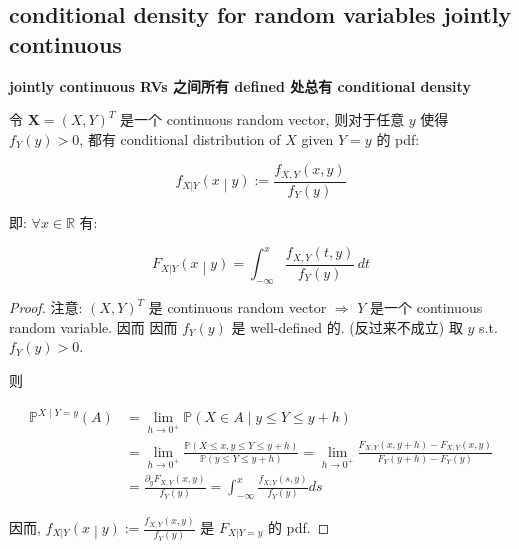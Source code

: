 \documentclass{qlnotes-export}
\begin{document}
\subsection{conditional density for random variables jointly continuous}\label{conditional-density-for-random-variables-jointly-continuous}

\begin{theorem}{\protect{}\label{kn-jointly-continuous-rvs-defined-conditional-density}{\textbf{jointly
continuous RVs 之间所有 defined 处总有 conditional density}}}\label{thm-03-joint-conditional-distribution-jointly-continuous-rvs-defined-conditional-density}

令 \(\mathbf{X} = (X,Y)^{T}\) 是一个 continuous random vector, 则对于任意 \(y\) 使得 \(f_{Y}(y) > 0\), 都有 conditional distribution of \(X\) given \(Y = y\) 的 pdf:

\[\left. f_{X|Y}(x \middle| y) := \frac{f_{X,Y}(x,y)}{f_{Y}(y)} \right.\]

即: \(\forall x \in {\mathbb{R}}\) 有:

\[\left. F_{X|Y}(x \middle| y) = \int_{- \infty}^{x}\frac{f_{X,Y}(t,y)}{f_{Y}(y)}\, dt \right.\]

\end{theorem}

\begin{proof}

注意: \((X,Y)^{T}\) 是 continuous random vector \(\Longrightarrow\) \(Y\) 是一个 continuous random variable. 因而 因而 \(f_{Y}(y)\) 是 well-defined 的. (反过来不成立) 取 \(y\) s.t. \(f_{Y}(y) > 0\).

则

\[\begin{matrix}
{{\mathbb{P}}^{X \mid Y = y}(A)} & {= \lim\limits_{h\rightarrow 0^{+}}{\mathbb{P}}(X \in A \mid y \leq Y \leq y + h)} \\
 & {= \lim\limits_{h\rightarrow 0^{+}}\frac{{\mathbb{P}}(X \leq x,y \leq Y \leq y + h)}{{\mathbb{P}}(y \leq Y \leq y + h)} = \lim\limits_{h\rightarrow 0^{+}}\frac{F_{X,Y}(x,y + h) - F_{X,Y}(x,y)}{F_{Y}(y + h) - F_{Y}(y)}} \\
 & {= \frac{\partial_{y}F_{X,Y}(x,y)}{f_{Y}(y)} = \int_{- \infty}^{x}\frac{f_{X,Y}(s,y)}{f_{Y}(y)}ds}
\end{matrix}\]

因而, \(\left. f_{X|Y}(x \middle| y) := \frac{f_{X,Y}(x,y)}{f_{Y}(y)} \right.\) 是 \(F_{X|Y = y}\) 的 pdf.

\end{proof}
\end{document}
